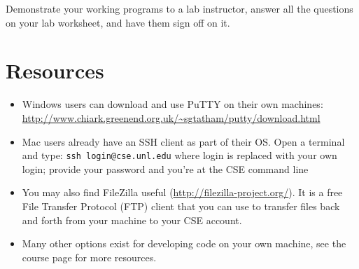 \documentclass[12pt]{scrartcl}
\begin{document}
Demonstrate your working programs to a lab instructor, answer all the 
questions on your lab worksheet, and have them sign off on it.

\section*{Resources}

\begin{itemize} 
  \item Windows users can download and use PuTTY on their own machines: \\
  	\url{http://www.chiark.greenend.org.uk/~sgtatham/putty/download.html}
  \item Mac users already have an SSH client as part of their OS.  Open a terminal and type:
  	\texttt{ssh login@cse.unl.edu} where login is replaced with
	your own login; provide your password and you're at the CSE command line
  \item You may also find FileZilla useful (\url{http://filezilla-project.org/}).  It is a 
  	free File Transfer Protocol (FTP) client that you can use to transfer files 
	back and forth from your machine to your CSE account.
  \item Many other options exist for developing code on your own machine, see the 
    course page for more resources.
\end{itemize}
\end{document}
